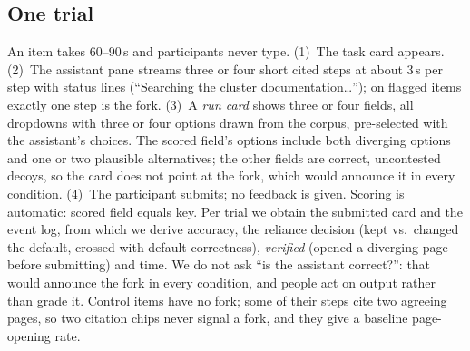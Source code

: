\documentclass[sigconf,nonacm]{acmart}
\begin{document}
\subsection{One trial}
\label{sec:trial}

An item takes 60--90\,s and participants never type. (1)~The task card
appears. (2)~The assistant pane streams three or four short cited steps at
about 3\,s per step with status lines (``Searching the cluster
documentation\ldots''); on flagged items exactly one step is the fork.
(3)~A \emph{run card} shows three or four fields, all dropdowns with three
or four options drawn from the corpus, pre-selected with the assistant's
choices. The scored field's options include both diverging options and one
or two plausible alternatives; the other fields are correct, uncontested
decoys, so the card does not point at the fork, which would announce it in
every condition. (4)~The participant submits; no feedback is given.
Scoring is automatic: scored field equals key. Per trial we obtain the
submitted card and the event log, from which we derive accuracy, the
reliance decision (kept vs.\ changed the default, crossed with default
correctness), \emph{verified} (opened a diverging page before submitting)
and time. We do not ask ``is the assistant correct?'': that would announce
the fork in every condition, and people act on output rather than grade
it. Control items have no fork; some of their steps cite two agreeing
pages, so two citation chips never signal a fork, and they give a baseline
page-opening rate.
\end{document}

